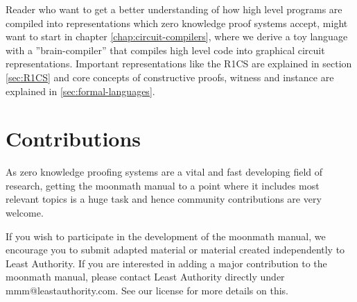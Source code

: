 Reader who want to get a better understanding of how high level programs are compiled into representations which zero knowledge proof systems accept, might want to start in chapter \ref{chap:circuit-compilers}, where we derive a toy language with a ''brain-compiler'' that compiles high level code into graphical circuit representations. Important representations like the R1CS are explained in section \ref{sec:R1CS} and core concepts of constructive proofs, witness and instance are explained in \ref{sec:formal-languages}.   

\section{Contributions} As zero knowledge proofing systems are a vital and fast developing field of research, getting the moonmath manual to a point where it includes most relevant topics is a huge task and hence community contributions are very welcome.

If you wish to participate in the development of the moonmath manual, we encourage you to submit adapted material or material created independently to Least Authority. If you are interested in adding a major contribution to the moonmath manual, please contact Least Authority directly under mmm@leastauthority.com. See our license for more details on this.


